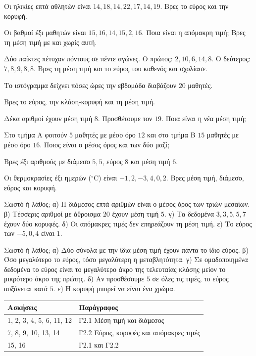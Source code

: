 \ex Οι ηλικίες επτά αθλητών είναι $14, 18, 14, 22, 17, 14, 19$. Βρες το εύρος και την κορυφή.

\ex Οι βαθμοί έξι μαθητών είναι $15, 16, 14, 15, 2, 16$. Ποια είναι η απόμακρη τιμή; Βρες τη μέση τιμή με και χωρίς αυτή.

\ex Δύο παίκτες πέτυχαν πόντους σε πέντε αγώνες. Ο πρώτος: $2, 10, 6, 14, 8$. Ο δεύτερος: $7, 8, 9, 8, 8$. Βρες τη μέση τιμή και το εύρος του καθενός και σχολίασε.

\ex Το ιστόγραμμα δείχνει πόσες ώρες την εβδομάδα διαβάζουν $20$ μαθητές.
\begin{center}
\end{center}
Βρες το εύρος, την κλάση-κορυφή και τη μέση τιμή.

\ex Δέκα αριθμοί έχουν μέση τιμή $8$. Προσθέτουμε τον $19$. Ποια είναι η νέα μέση τιμή;

\ex Στο τμήμα Α φοιτούν $5$ μαθητές με μέσο όρο $12$ και στο τμήμα Β $15$ μαθητές με μέσο όρο $16$. Ποιος είναι ο μέσος όρος και των δύο μαζί;

\ex Βρες έξι αριθμούς με διάμεσο $5{,}5$, εύρος $8$ και μέση τιμή $6$.

\ex Οι θερμοκρασίες έξι ημερών ($^\circ$C) είναι $-1, 2, -3, 4, 0, 2$. Βρες μέση τιμή, διάμεσο, εύρος και κορυφή.

\ex Σωστό ή λάθος; α) Η διάμεσος επτά αριθμών είναι ο μέσος όρος των τριών μεσαίων. β) Τέσσερις αριθμοί με άθροισμα $20$ έχουν μέση τιμή $5$. γ) Τα δεδομένα $3,3,5,5,7$ έχουν δύο κορυφές. δ) Οι απόμακρες τιμές δεν επηρεάζουν τη μέση τιμή. ε) Το εύρος των $-5, 0, 4$ είναι $1$.

\ex Σωστό ή λάθος; α) Δύο σύνολα με την ίδια μέση τιμή έχουν πάντα το ίδιο εύρος. β) Όσο μεγαλύτερο το εύρος, τόσο μεγαλύτερη η μεταβλητότητα. γ) Σε ομαδοποιημένα δεδομένα το εύρος είναι το μεγαλύτερο άκρο της τελευταίας κλάσης μείον το μικρότερο άκρο της πρώτης. δ) Αν προσθέσουμε $5$ σε όλες τις τιμές, το εύρος αυξάνεται κατά $5$. ε) Η κορυφή μπορεί να είναι ένα χρώμα.


\begin{center}
\renewcommand{\arraystretch}{1.3}
\begin{tabular}{ll}
\toprule
\textbf{Ασκήσεις} & \textbf{Παράγραφος}\\
\midrule
1, 2, 3, 4, 5, 6, 11, 12 & Γ2.1 Μέση τιμή και διάμεσος\\
7, 8, 9, 10, 13, 14 & Γ2.2 Εύρος, κορυφές και απόμακρες τιμές\\
15, 16 & Γ2.1 και Γ2.2\\
\bottomrule
\end{tabular}
\end{center}
